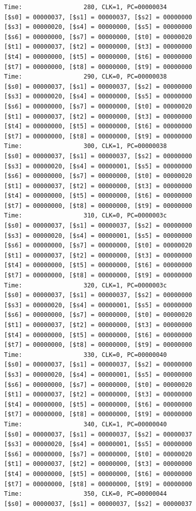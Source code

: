 \documentclass[a4paper,12pt]{article}
\begin{document}
\begin{lstlisting}
Time:                 280, CLK=1, PC=00000034
[$s0] = 00000037, [$s1] = 00000037, [$s2] = 00000000
[$s3] = 00000020, [$s4] = 00000000, [$s5] = 00000000
[$s6] = 00000000, [$s7] = 00000000, [$t0] = 00000020
[$t1] = 00000037, [$t2] = 00000000, [$t3] = 00000000
[$t4] = 00000000, [$t5] = 00000000, [$t6] = 00000000
[$t7] = 00000000, [$t8] = 00000000, [$t9] = 00000000
Time:                 290, CLK=0, PC=00000038
[$s0] = 00000037, [$s1] = 00000037, [$s2] = 00000000
[$s3] = 00000020, [$s4] = 00000000, [$s5] = 00000000
[$s6] = 00000000, [$s7] = 00000000, [$t0] = 00000020
[$t1] = 00000037, [$t2] = 00000000, [$t3] = 00000000
[$t4] = 00000000, [$t5] = 00000000, [$t6] = 00000000
[$t7] = 00000000, [$t8] = 00000000, [$t9] = 00000000
Time:                 300, CLK=1, PC=00000038
[$s0] = 00000037, [$s1] = 00000037, [$s2] = 00000000
[$s3] = 00000020, [$s4] = 00000001, [$s5] = 00000000
[$s6] = 00000000, [$s7] = 00000000, [$t0] = 00000020
[$t1] = 00000037, [$t2] = 00000000, [$t3] = 00000000
[$t4] = 00000000, [$t5] = 00000000, [$t6] = 00000000
[$t7] = 00000000, [$t8] = 00000000, [$t9] = 00000000
Time:                 310, CLK=0, PC=0000003c
[$s0] = 00000037, [$s1] = 00000037, [$s2] = 00000000
[$s3] = 00000020, [$s4] = 00000001, [$s5] = 00000000
[$s6] = 00000000, [$s7] = 00000000, [$t0] = 00000020
[$t1] = 00000037, [$t2] = 00000000, [$t3] = 00000000
[$t4] = 00000000, [$t5] = 00000000, [$t6] = 00000000
[$t7] = 00000000, [$t8] = 00000000, [$t9] = 00000000
Time:                 320, CLK=1, PC=0000003c
[$s0] = 00000037, [$s1] = 00000037, [$s2] = 00000000
[$s3] = 00000020, [$s4] = 00000001, [$s5] = 00000000
[$s6] = 00000000, [$s7] = 00000000, [$t0] = 00000020
[$t1] = 00000037, [$t2] = 00000000, [$t3] = 00000000
[$t4] = 00000000, [$t5] = 00000000, [$t6] = 00000000
[$t7] = 00000000, [$t8] = 00000000, [$t9] = 00000000
Time:                 330, CLK=0, PC=00000040
[$s0] = 00000037, [$s1] = 00000037, [$s2] = 00000000
[$s3] = 00000020, [$s4] = 00000001, [$s5] = 00000000
[$s6] = 00000000, [$s7] = 00000000, [$t0] = 00000020
[$t1] = 00000037, [$t2] = 00000000, [$t3] = 00000000
[$t4] = 00000000, [$t5] = 00000000, [$t6] = 00000000
[$t7] = 00000000, [$t8] = 00000000, [$t9] = 00000000
Time:                 340, CLK=1, PC=00000040
[$s0] = 00000037, [$s1] = 00000037, [$s2] = 00000037
[$s3] = 00000020, [$s4] = 00000001, [$s5] = 00000000
[$s6] = 00000000, [$s7] = 00000000, [$t0] = 00000020
[$t1] = 00000037, [$t2] = 00000000, [$t3] = 00000000
[$t4] = 00000000, [$t5] = 00000000, [$t6] = 00000000
[$t7] = 00000000, [$t8] = 00000000, [$t9] = 00000000
Time:                 350, CLK=0, PC=00000044
[$s0] = 00000037, [$s1] = 00000037, [$s2] = 00000037

\end{lstlisting}
\end{document}
